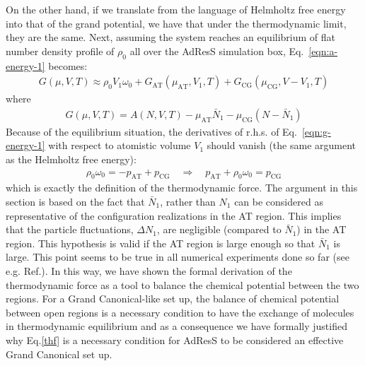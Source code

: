 \documentclass[aip,jcp,a4paper,reprint,onecolumn]{revtex4-1}
\newcommand{\redc}[1]{{\color{red} #1}}
\newcommand{\AT}{{\textrm{{AT}}}}
\newcommand{\CG}{{\textrm{CG}}}
\begin{document}
\noindent
On the other hand, if we translate from the language of Helmholtz free
energy into that of the grand potential, we have that
under the thermodynamic limit, they are the same.
Next, assuming the system reaches an
equilibrium of flat \redc{number} density profile of $\rho_0$ all over the AdResS simulation box, 
Eq.~\eqref{eqn:a-energy-1} becomes:
\begin{align}\label{eqn:g-energy-1}
  G(\mu, V, T) \approx
  \rho_0V_1\omega_0
  + G_{\AT}(\mu_{\AT}, V_1, T) + G_{\CG}(\mu_{\CG}, V - V_1, T)
\end{align}
where
\begin{align}
  G(\mu, V, T) = A(N, V, T) - \mu_{\AT} \bar N_1 - \mu_{\CG}(N - \bar N_1)
\end{align}
Because of the equilibrium situation, the \redc{derivatives} of r.h.s. of
Eq.~\eqref{eqn:g-energy-1} with respect to atomistic volume $V_1$
should \redc{vanish} (the same argument as the Helmholtz free energy):
\begin{align}
  \rho_0\omega_0 = -p_{\AT}+p_{\CG} \quad\Longrightarrow\quad
  p_{\AT} + \rho_0\omega_0 = p_{\CG}
\end{align}
which is exactly the definition of the thermodynamic force.
The argument in this section is based on the fact that $\bar N_{1}$, rather than $N_{1}$ can be considered as representative of the configuration realizations in the AT region. This implies that the particle fluctuations, $\Delta N_{1}$,
are negligible (compared to $\bar N_{1}$) in the AT region. This hypothesis is valid if the AT region is large enough so that $\bar N_{1}$ is large. This point seems to be true in all numerical experiments done so far (see e.g. Ref.\cite{debash}). In this way, we have shown the formal derivation of the thermodynamic force as a tool to balance the chemical potential between the two regions. For a Grand Canonical-like set up, the balance of chemical potential between open regions is a necessary condition to have the exchange of molecules in thermodynamic equilibrium and as a consequence we have formally justified why Eq.\ref{thf} is a necessary condition for AdResS to be considered an effective Grand Canonical set up.
\end{document}
